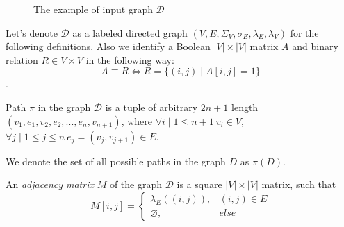 \begin{figure}[h]
    \centering        
    \caption{The example of input graph $\mathcal{D}$}
    \label{fig:example_input_graph}
\end{figure}


Let's denote $\mathcal{D}$ as a labeled directed graph $(V, E, \Sigma_V, \sigma_E, \lambda_E, \lambda_V)$ for the following definitions. Also we identify a Boolean $|V| \times |V|$ matrix $A$ and binary relation $R \in V \times V$ in the following way:
$$A \equiv R \iff R = \{(i, j) \mid A[i, j] = 1\}$$.

\begin{definition}
Path $\pi$ in the graph $\mathcal{D}$ is a tuple of arbitrary $2n +1$ length $(v_1, e_1, v_2, e_2, ..., e_n, v_{n+1})$, where $\forall i \mid 1 \leq n+1 ~ v_i \in V$, $\forall j \mid 1 \leq j \leq n ~ e_j=(v_j, v_{j+1}) \in E$.

We denote the set of all possible paths in the graph $D$ as $\pi(D)$. 
\end{definition}

\begin{definition}
An \emph{adjacency matrix} $M$ of the graph $\mathcal{D}$ is a square $|V|\times|V|$ matrix, such that 
\begin{equation*}
M[i,j] =
 \begin{cases}
   \lambda_E((i, j)), & (i, j) \in E\\
   \varnothing, & else
 \end{cases}
\end{equation*}
\end{definition}

